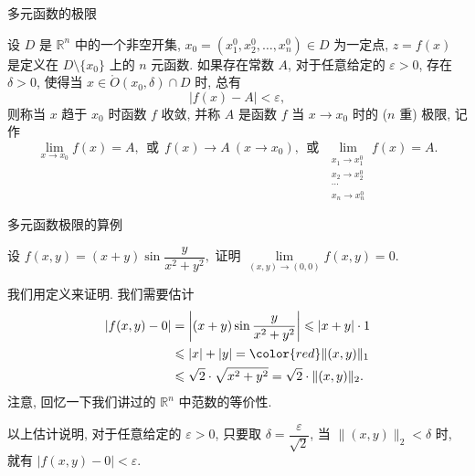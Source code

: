\begin{frame}{多元函数的极限}

\begin{Def}[多元函数的极限]
设 $D$ 是 $\mathbb{R}^n$ 中的一个非空开集, $x_0 = (x_1^0, x_2^0, \ldots, x_n^0) \in D$ 为一定点, $z = f(x)$ 是定义在 $D \setminus \{x_0\}$ 上的 $n$ 元函数. 如果存在常数 $A$, 对于任意给定的 $\varepsilon > 0$, 存在 $\delta > 0$, 使得当 $x \in \mathring{O}(x_0, \delta) \cap D$ 时, 总有
\[\lvert f(x) - A \rvert < \varepsilon,\]
则称当 $x$ 趋于 $x_0$ 时函数 $f$ 收敛, 并称 $A$ 是函数 $f$ 当 $x \to x_0$ 时的 {\color{red}($n$ 重) 极限}, 记作
\[\lim_{x \to x_0} f(x) = A, ~~ \text{或} ~~ f(x) \to A ~ (x \to x_0), ~~ \text{或} ~~ \lim_{\substack{x_1 \to x_1^0 \\ x_2 \to x_2^0 \\ \cdots \\ x_n \to x_n^0}} f(x) = A.\]
\end{Def}

\end{frame}


\begin{frame}{多元函数极限的算例}

\begin{eg}
设 $f(x, y) = (x + y) \sin\dfrac{y}{x^2+y^2},$ 证明 $\lim\limits_{(x,y) \to (0,0)} f(x,y) = 0.$
\end{eg}

\pause

我们用定义来证明. 我们需要估计
\begin{align*}
\lvert f(x,y) - 0 \rvert & = \left\lvert (x + y) \sin\dfrac{y}{x^2+y^2} \right\rvert \leqslant \lvert x + y \rvert \cdot 1 \\
& \leqslant \lvert x \rvert + \lvert y \rvert = {\color{red}\lVert (x, y) \rVert_1} \\
& \leqslant \sqrt{2} \cdot \sqrt{x^2 + y^2} = \sqrt{2} \cdot \lVert (x, y) \rVert_2.
\end{align*}
\pause
{\color{red}注意}, 回忆一下我们讲过的 $\mathbb{R}^n$ 中范数的等价性.

\pause
\vspace{0.5em}

以上估计说明, 对于任意给定的 $\varepsilon > 0$, 只要取 $\delta = \dfrac{\varepsilon}{\sqrt{2}}$, 当 $\lVert (x, y) \rVert_2 < \delta$ 时, 就有 $\lvert f(x,y) - 0 \rvert < \varepsilon.$

\end{frame}

